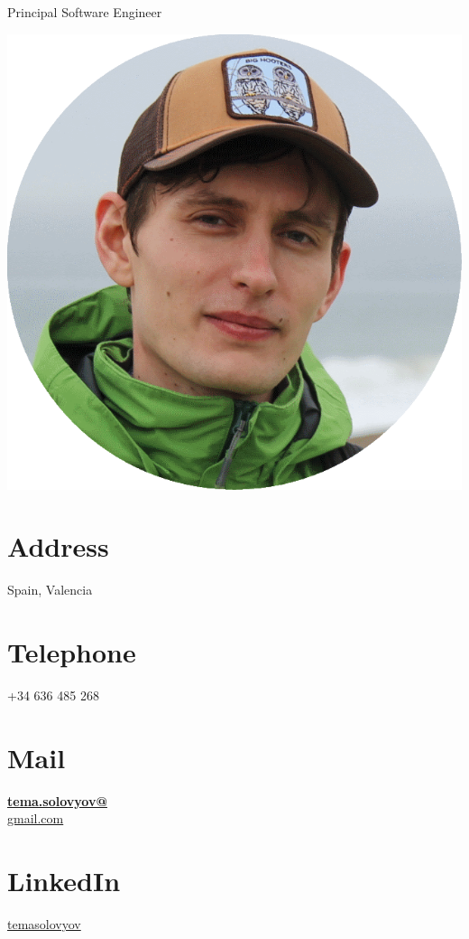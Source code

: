 \documentclass[]{friggeri-cv}
\begin{document}
      {Principal Software Engineer}
      

\begin{aside}
  \includegraphics[scale=0.18]{img/ava.png}
  \section{Address}
    Spain, Valencia
    ~
  \section{Telephone}
    +34 636 485 268
    ~
  \section{Mail}
    \href{mailto:tema.solovyov@gmail.com}{\textbf{tema.solovyov@}\\gmail.com}
    ~
  \section{LinkedIn}
    \href{https://www.linkedin.com/in/temasolovyov}{temasolovyov}
    ~

\end{aside}
\end{document}
